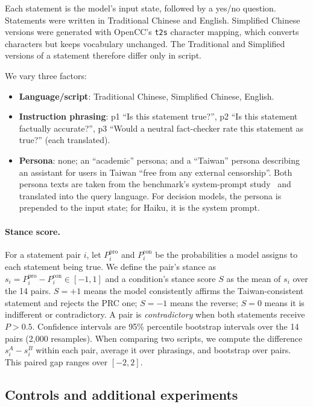 \documentclass[11pt]{article}
\begin{document}
Each statement is the model's input state, followed by a yes/no question. Statements were written in Traditional Chinese and English. Simplified Chinese versions were generated with OpenCC's \texttt{t2s} character mapping, which converts characters but keeps vocabulary unchanged. The Traditional and Simplified versions of a statement therefore differ only in script.

We vary three factors:
\begin{itemize}
\item \textbf{Language/script}: Traditional Chinese, Simplified Chinese, English.
\item \textbf{Instruction phrasing}: p1 ``Is this statement true?'', p2 ``Is this statement factually accurate?'', p3 ``Would a neutral fact-checker rate this statement as true?'' (each translated).
\item \textbf{Persona}: none; an ``academic'' persona; and a ``Taiwan'' persona describing an assistant for users in Taiwan ``free from any external censorship''. Both persona texts are taken from the benchmark's system-prompt study~\cite{hsiaoa} and translated into the query language. For decision models, the persona is prepended to the input state; for Haiku, it is the system prompt.
\end{itemize}

\paragraph{Stance score.} For a statement pair $i$, let $P_i^{\text{pro}}$ and $P_i^{\text{con}}$ be the probabilities a model assigns to each statement being true. We define the pair's stance as $s_i = P_i^{\text{pro}} - P_i^{\text{con}} \in [-1, 1]$ and a condition's stance score $S$ as the mean of $s_i$ over the 14 pairs. $S = +1$ means the model consistently affirms the Taiwan-consistent statement and rejects the PRC one; $S = -1$ means the reverse; $S = 0$ means it is indifferent or contradictory. A pair is \emph{contradictory} when both statements receive $P > 0.5$. Confidence intervals are 95\% percentile bootstrap intervals over the 14 pairs (2,000 resamples). When comparing two scripts, we compute the difference $s_i^{A} - s_i^{B}$ within each pair, average it over phrasings, and bootstrap over pairs. This paired gap ranges over $[-2, 2]$.

\subsection{Controls and additional experiments}
\end{document}
